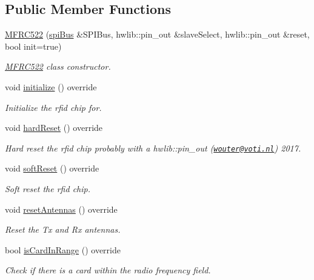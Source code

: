 \subsection*{Public Member Functions}
\begin{DoxyCompactItemize}
\item 
\mbox{\hyperlink{class_m_f_r_c522_a70e6c463aec08918c71c2e0c77742b4b}{M\+F\+R\+C522}} (\mbox{\hyperlink{classspi_bus}{spi\+Bus}} \&S\+P\+I\+Bus, hwlib\+::pin\+\_\+out \&slave\+Select, hwlib\+::pin\+\_\+out \&reset, bool init=true)
\begin{DoxyCompactList}\small\item\em \mbox{\hyperlink{class_m_f_r_c522}{M\+F\+R\+C522}} class constructor. \end{DoxyCompactList}\item 
void \mbox{\hyperlink{class_m_f_r_c522_a5f589b09eaf150551b369052ce125fa1}{initialize}} () override
\begin{DoxyCompactList}\small\item\em Initialize the rfid chip for. \end{DoxyCompactList}\item 
void \mbox{\hyperlink{class_m_f_r_c522_a016df9ed0421397c634cc79c475dbe3b}{hard\+Reset}} () override
\begin{DoxyCompactList}\small\item\em Hard reset the rfid chip probably with a hwlib\+::pin\+\_\+out (\href{mailto:wouter@voti.nl}{\tt wouter@voti.\+nl}) 2017. \end{DoxyCompactList}\item 
\mbox{\label{class_m_f_r_c522_ae51e1e0bee2b7a65d6314bfb48121f1d}} 
void \mbox{\hyperlink{class_m_f_r_c522_ae51e1e0bee2b7a65d6314bfb48121f1d}{soft\+Reset}} () override
\begin{DoxyCompactList}\small\item\em Soft reset the rfid chip. \end{DoxyCompactList}\item 
void \mbox{\hyperlink{class_m_f_r_c522_ac981022cc3ae79f727b2365e309cf691}{reset\+Antennas}} () override
\begin{DoxyCompactList}\small\item\em Reset the Tx and Rx antennas. \end{DoxyCompactList}\item 
bool \mbox{\hyperlink{class_m_f_r_c522_a019f76569bddf9c2f9f94eca13a618d7}{is\+Card\+In\+Range}} () override
\begin{DoxyCompactList}\small\item\em Check if there is a card within the radio frequency field. \end{DoxyCompactList}\item 

\end{DoxyCompactItemize}
